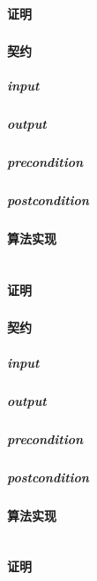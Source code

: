 \documentclass[a4paper]{book}
\numberwithin{equation}{chapter}
\theoremstyle{definition}
\begin{document}
\begin{multicols}{2}
\begin{lstlisting}
\end{lstlisting}
\paragraph{证明}

\subsubsection{}
\paragraph{契约}
\subparagraph{input}

\subparagraph{output}

\subparagraph{precondition}

\subparagraph{postcondition}

\paragraph{算法实现}
\begin{lstlisting}

\end{lstlisting}
\paragraph{证明}

\subsubsection{}
\paragraph{契约}
\subparagraph{input}

\subparagraph{output}

\subparagraph{precondition}

\subparagraph{postcondition}

\paragraph{算法实现}
\begin{lstlisting}

\end{lstlisting}
\paragraph{证明}


\end{multicols}
\end{document}
